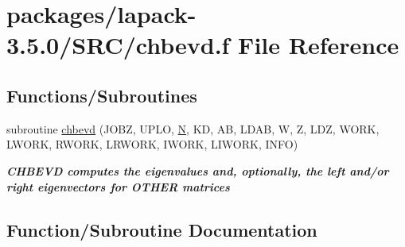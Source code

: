 \hypertarget{chbevd_8f}{}\section{packages/lapack-\/3.5.0/\+S\+R\+C/chbevd.f File Reference}
\label{chbevd_8f}
\subsection*{Functions/\+Subroutines}
\begin{DoxyCompactItemize}
\item 
subroutine \hyperlink{chbevd_8f_a90a780f962a7affa9b0ee155985e80ab}{chbevd} (J\+O\+B\+Z, U\+P\+L\+O, \hyperlink{polmisc_8c_a0240ac851181b84ac374872dc5434ee4}{N}, K\+D, A\+B, L\+D\+A\+B, W, Z, L\+D\+Z, W\+O\+R\+K, L\+W\+O\+R\+K, R\+W\+O\+R\+K, L\+R\+W\+O\+R\+K, I\+W\+O\+R\+K, L\+I\+W\+O\+R\+K, I\+N\+F\+O)
\begin{DoxyCompactList}\small\item\em {\bfseries  C\+H\+B\+E\+V\+D computes the eigenvalues and, optionally, the left and/or right eigenvectors for O\+T\+H\+E\+R matrices} \end{DoxyCompactList}\end{DoxyCompactItemize}


\subsection{Function/\+Subroutine Documentation}
\hypertarget{chbevd_8f_a90a780f962a7affa9b0ee155985e80ab}{}

